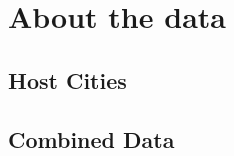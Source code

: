 \documentclass[a4 paper, 12pt]{article}
\begin{document}
\pagebreak
\appendix
\appendixpage
\addappheadtotoc
\section{About the data}

\subsection{Host Cities}


\pagebreak
\subsection{Combined Data}

\end{document}
